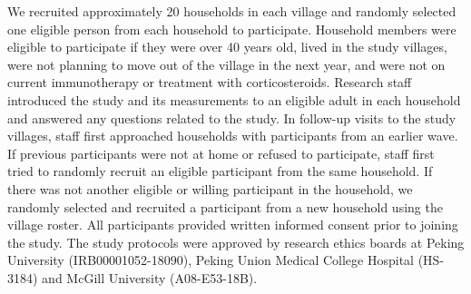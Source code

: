 \documentclass[
  letterpaper,
  DIV=11,
  numbers=noendperiod]{scrartcl}
\providecommand{\DIFaddtex}[1]{{\protect\color{blue}\uwave{#1}}} %
\providecommand{\DIFaddbegin}{} %
\providecommand{\DIFaddend}{} %
\providecommand{\DIFdelbegin}{} %
\providecommand{\DIFdelend}{} %
\providecommand{\DIFadd}[1]{\texorpdfstring{\DIFaddtex{#1}}{#1}} %
\newcommand{\DIFscaledelfig}{0.5}
\newlength{\DIFdelgraphicswidth} %
\newlength{\DIFdelgraphicsheight} %
\newcommand{\DIFaddincludegraphics}[2][]{{\color{blue}\fbox{\DIFOincludegraphics[#1]{#2}}}} %
\newcommand{\DIFdelincludegraphics}[2][]{%
\sbox{\DIFdelgraphicsbox}{\DIFOincludegraphics[#1]{#2}}%
\settoboxwidth{\DIFdelgraphicswidth}{\DIFdelgraphicsbox} %
\settoboxtotalheight{\DIFdelgraphicsheight}{\DIFdelgraphicsbox} %
\scalebox{\DIFscaledelfig}{%
\parbox[b]{\DIFdelgraphicswidth}{\usebox{\DIFdelgraphicsbox}\\[-\baselineskip] \rule{\DIFdelgraphicswidth}{0em}}\llap{\resizebox{\DIFdelgraphicswidth}{\DIFdelgraphicsheight}{%
\setlength{\unitlength}{\DIFdelgraphicswidth}%
\begin{picture}(1,1)%
\thicklines\linethickness{2pt} %
{\color[rgb]{1,0,0}\put(0,0){\framebox(1,1){}}}%
{\color[rgb]{1,0,0}\put(0,0){\line( 1,1){1}}}%
{\color[rgb]{1,0,0}\put(0,1){\line(1,-1){1}}}%
\end{picture}%
}\hspace*{3pt}}} %
} %
\DeclareRobustCommand{\DIFaddbegin}{\DIFOaddbegin \let\includegraphics\DIFaddincludegraphics} %
\DeclareRobustCommand{\DIFaddend}{\DIFOaddend \let\includegraphics\DIFOincludegraphics} %
\DeclareRobustCommand{\DIFdelbegin}{\DIFOdelbegin \let\includegraphics\DIFdelincludegraphics} %
\DeclareRobustCommand{\DIFdelend}{\DIFOaddend \let\includegraphics\DIFOincludegraphics} %
\begin{document}
We recruited approximately 20 households in each village and randomly
selected one eligible person from each household to participate.
Household members were eligible to participate if they were over 40
years old, lived in the study villages, were not planning to move out of
the village in the next year, and were not on current immunotherapy or
treatment with corticosteroids. Research staff introduced the study and
its measurements to an eligible adult in each household and answered any
questions related to the study. In follow-up visits to the study
villages, staff first approached households with participants from an
earlier wave. If previous participants were not at home or refused to
participate, staff first tried to randomly recruit an eligible
participant from the same household. If there was not another eligible
or willing participant in the household, we randomly selected and
recruited a participant from a new household using the village roster.
All participants provided written informed consent prior to joining the
study. The study protocols were approved by research ethics boards at
Peking University (IRB00001052-18090), Peking Union Medical College
Hospital (HS-3184) and McGill University (A08-E53-18B).

\DIFdelbegin %
\DIFdelend \DIFaddbegin \subsection{\DIFadd{Data Collection Overview}}\label{data-collection-overview}
\DIFaddend 
\end{document}
